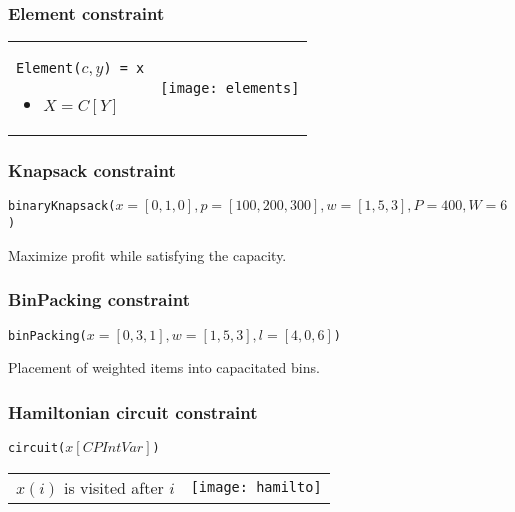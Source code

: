 \subsubsection{Element constraint}

\begin{tabular}{m{6cm}m{6cm}}
    \texttt{Element($c, y$) = x}
    \begin{itemize}
        \item $X = C[Y]$
    \end{itemize}
    &
    \texttt{[image: elements]}
\end{tabular}

\subsubsection{Knapsack constraint}
\begin{center}
    \texttt{binaryKnapsack($x=[0, 1, 0], p=[100, 200, 300], w=[1, 5, 3],
    P=400, W=6$)}
\end{center}
Maximize profit while satisfying the capacity.

\subsubsection{BinPacking constraint}
\begin{center}
    \texttt{binPacking($x=[0, 3, 1], w=[1, 5, 3], l=[4, 0, 6]$)}
\end{center}
Placement of weighted items into capacitated bins.

\subsubsection{Hamiltonian circuit constraint}
\begin{center}
    \texttt{circuit($x[CPIntVar]$)}
\end{center}

\begin{tabular}{m{5cm}m{10cm}}
$x(i)$ is visited after $i$
&
    \texttt{[image: hamilto]}
\end{tabular}


